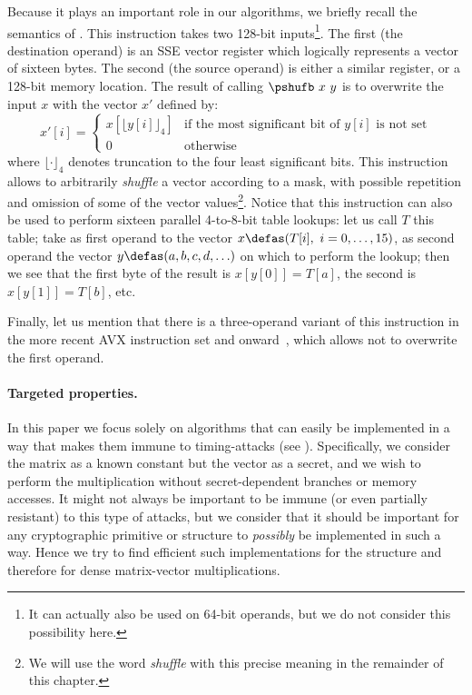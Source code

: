 Because it plays an important role in our algorithms, we briefly recall the semantics of \pshufb{}.
This instruction takes two 128-bit inputs\footnote{It can actually also be used on 64-bit operands, but we do not
consider this possibility here.}. The first (the destination operand) is an \xmm{} SSE vector register which logically represents
a vector of sixteen bytes. The second (the source operand) is either a similar \xmm{} register, or a 128-bit memory location. The result of calling
$\pshufb~x~y$ is to overwrite the input $x$ with the vector $x'$ defined by:
\[
x'[i] = \left\{
				\begin{array}{ll}
				x[\lfloor y[i]\rfloor_4]  & \text{if the most significant bit of $y[i]$ is not set}\\
				0 & \text{otherwise}
				\end{array}
	    \right.
\]
where $\lfloor\cdot\rfloor_4$ denotes truncation to the four least significant bits.
This instruction allows to arbitrarily \emph{shuffle} a vector according to a mask, with possible repetition and omission of some of the vector
values\footnote{We will use the word \emph{shuffle} with this precise meaning in the remainder of this chapter.}.
Notice that this instruction can also be used to perform sixteen parallel 4-to-8-bit table lookups: let us call $T$ this table; take
as first operand to \pshufb{} the vector $x \defas (T[i],~i = 0,\ldots,15)$, as second operand the vector
$y \defas (a, b, c, d, \ldots)$
on which to perform the lookup; then we see that the first byte of the result is $x[y[0]] = T[a]$, the second is $x[y[1]] = T[b]$,
etc.

Finally, let us mention that there is a three-operand variant of this instruction in the more recent AVX instruction set and onward~\cite{ia64},
which allows not to overwrite the first operand.


\paragraph{Targeted properties.} In this paper we focus solely on algorithms that can easily be implemented in a way that makes
them immune to timing-attacks (see \eg \cite{timinattacks}). Specifically, we consider the matrix as a known constant but the vector as a secret, and we wish to perform
the multiplication without secret-dependent branches or memory accesses. It might not always be important to be immune (or even partially resistant) to this type
of attacks, but we consider that it should be important for any cryptographic primitive or structure to \emph{possibly} be implemented in such a way. Hence we try
to find efficient such implementations for the \shark{} structure and therefore for dense matrix-vector multiplications.

